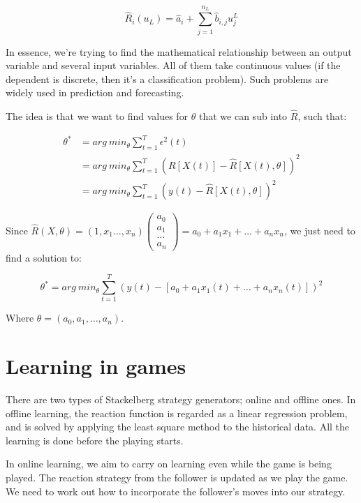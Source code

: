 \[
  \hat{R}_i(u_L) = \hat{a}_i + \sum^{n_L}_{j=1}\hat{b}_{i,j}u^L_{j}
\]

In essence, we're trying to find the mathematical relationship between an output
variable and several input variables. All of them take continuous values (if the
dependent is discrete, then it's a classification problem). Such problems are
widely used in prediction and forecasting.

The idea is that we want to find values for $\theta$ that we can sub into
$\hat{R}$, such that:

\[
  \begin{split}
  \theta^* &= arg~min_\theta \sum^T_{t=1}\epsilon^2(t)\\
           &= arg~min_\theta \sum^T_{t=1}(R[X(t)] - \hat{R}[X(t), \theta])^2\\
           &= arg~min_\theta \sum^T_{t=1}(y(t) - \hat{R}[X(t), \theta])^2
  \end{split}
\]

Since $\hat{R}(X, \theta) = (1, x_1 \dots, x_n) \left( \begin{smallmatrix}
a_0\\ a_1\\ \dots \\ a_n \end{smallmatrix} \right) = a_0 + a_1x_1 + \dots +
a_nx_n$, we just need to find a solution to:

\[
  \theta^* = arg~min_\theta \sum^T_{t=1}(y(t) - [a_0 + a_1x_1(t) + \dots +
a_nx_n(t)])^2
\]

Where $\theta = (a_0, a_1, \dots, a_n)$.



\section{Learning in games}

There are two types of Stackelberg strategy generators; online and offline ones.
In offline learning, the reaction function is regarded as a linear regression
problem, and is solved by applying the least square method to the historical
data. All the learning is done before the playing starts.

In online learning, we aim to carry on learning even while the game is being
played. The reaction strategy from the follower is updated as we play the game.
We need to work out how to incorporate the follower's moves into our strategy.

